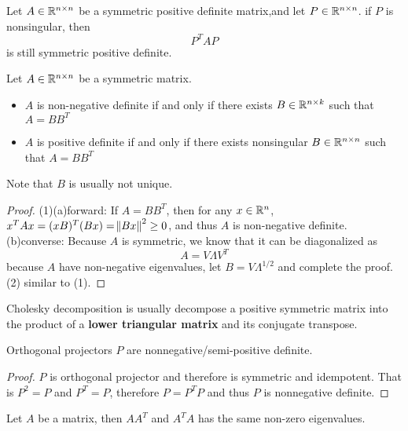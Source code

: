 \begin{refsection}
\begin{corollary}
Let $A\in \mathbb{R}^{n\times n}$ be a symmetric positive definite matrix,and let $P\in \mathbb{R}^{n\times n}$. if $P$ is nonsingular, then
$$P^TAP$$ is still symmetric positive definite.	
\end{corollary}


\begin{theorem}[decomposition]\label{ch:linearalgebra:th:symmetricdecomposition}
	Let $A \in \mathbb{R}^{n\times n}$ be a symmetric matrix.
	\begin{itemize}
		\item $A$ is non-negative definite if and only if there exists $B\in \mathbb{R}^{n\times k}$ such that  $A = BB^T$
		\item $A$ is positive definite if and only if there exists nonsingular $B\in \mathbb{R}^{n\times n}$ such that  $A = BB^T$
	\end{itemize} 
Note that $B$ is usually not unique.
\end{theorem}
\begin{proof}
(1)(a)forward: If $A = BB^T$, then for any $x\in \mathbb{R}^n$, $x^TAx = (xB)^T(Bx) = \norm{Bx}^2 \geq 0$, and thus $A$ is non-negative definite. (b)converse: Because $A$ is symmetric, we know that it can be diagonalized as
	$$A = V\Lambda V^T$$
	because $A$ have non-negative eigenvalues, let $B = V
	\Lambda^{1/2}$ and complete the proof.\\
	(2) similar to (1).
\end{proof}


\begin{remark}
	Cholesky decomposition is usually decompose a positive symmetric matrix into the product of a \textbf{lower triangular matrix} and its conjugate transpose. 
\end{remark}


\begin{corollary}
Orthogonal projectors $P$ are nonnegative/semi-positive definite.	
\end{corollary}
\begin{proof}
	$P$ is orthogonal projector and therefore is symmetric and idempotent. That is
	$P^2 = P$ and $P^T=P$, therefore $P=P^TP$ and thus $P$ is nonnegative definite.
\end{proof}
\begin{lemma}
	Let $A$ be a matrix, then $AA^T$ and $A^TA$ has the same non-zero eigenvalues. 
\end{lemma}


\end{refsection}

